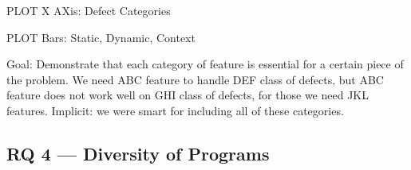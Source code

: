 \documentclass[conference]{IEEEtran}
\begin{document}
PLOT X AXis: Defect Categories

PLOT Bars: Static, Dynamic, Context

Goal: Demonstrate that each category of feature is essential for a certain
piece of the problem. We need ABC feature to handle DEF class of defects,
but ABC feature does not work well on GHI class of defects, for those we
need JKL features. Implicit: we were smart for including all of these
categories.

\subsection{RQ 4 --- Diversity of Programs}

%
%
%
%
%
%
%
%
%

\end{document}
